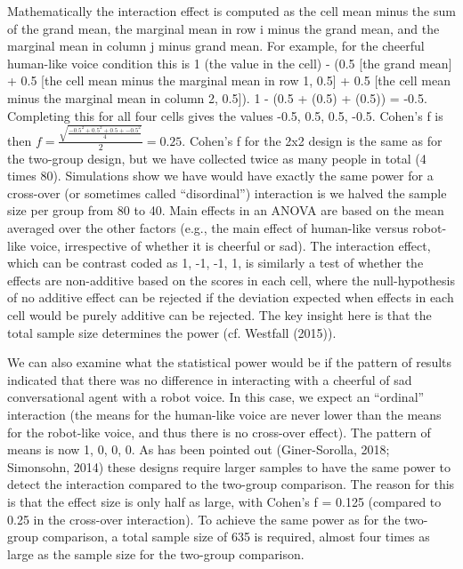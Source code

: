 \documentclass[,man,floatsintext]{apa6}
\begin{document}
Mathematically the interaction effect is computed as the cell mean minus
the sum of the grand mean, the marginal mean in row i minus the grand
mean, and the marginal mean in column j minus grand mean. For example,
for the cheerful human-like voice condition this is 1 (the value in the
cell) - (0.5 {[}the grand mean{]} + 0.5 {[}the cell mean minus the
marginal mean in row 1, 0.5{]} + 0.5 {[}the cell mean minus the marginal
mean in column 2, 0.5{]}). 1 - (0.5 + (0.5) + (0.5)) = -0.5. Completing
this for all four cells gives the values -0.5, 0.5, 0.5, -0.5. Cohen's f
is then
\(f = \frac { \sqrt { \frac { -0.5^2 + 0.5^2 + 0.5 + -0.5^2 } { 4 } }}{ 2 } = 0.25\).
Cohen's f for the 2x2 design is the same as for the two-group design,
but we have collected twice as many people in total (4 times 80).
Simulations show we have would have exactly the same power for a
cross-over (or sometimes called \enquote{disordinal}) interaction is we
halved the sample size per group from 80 to 40. Main effects in an ANOVA
are based on the mean averaged over the other factors (e.g., the main
effect of human-like versus robot-like voice, irrespective of whether it
is cheerful or sad). The interaction effect, which can be contrast coded
as 1, -1, -1, 1, is similarly a test of whether the effects are
non-additive based on the scores in each cell, where the null-hypothesis
of no additive effect can be rejected if the deviation expected when
effects in each cell would be purely additive can be rejected. The key
insight here is that the total sample size determines the power (cf.
Westfall (2015)).

We can also examine what the statistical power would be if the pattern
of results indicated that there was no difference in interacting with a
cheerful of sad conversational agent with a robot voice. In this case,
we expect an \enquote{ordinal} interaction (the means for the human-like
voice are never lower than the means for the robot-like voice, and thus
there is no cross-over effect). The pattern of means is now 1, 0, 0, 0.
As has been pointed out (Giner-Sorolla, 2018; Simonsohn, 2014) these
designs require larger samples to have the same power to detect the
interaction compared to the two-group comparison. The reason for this is
that the effect size is only half as large, with Cohen's f = 0.125
(compared to 0.25 in the cross-over interaction). To achieve the same
power as for the two-group comparison, a total sample size of 635 is
required, almost four times as large as the sample size for the
two-group comparison.
\end{document}
